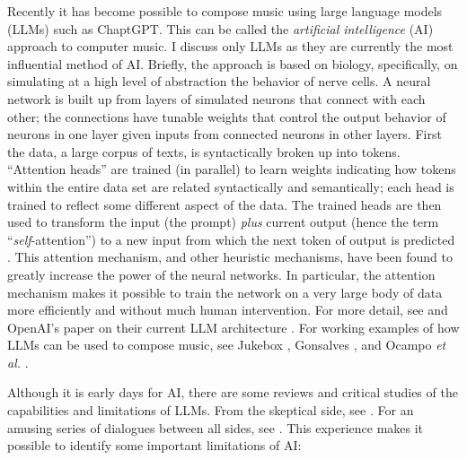 \documentclass[11pt,papersize=a4]{scrartcl}
\begin{document}
Recently it has become possible to compose music using large language models (LLMs) such as ChaptGPT. This can be called the \emph{artificial intelligence} (AI) approach to computer music. I discuss only LLMs as they are currently the most influential method of AI. Briefly, the approach is based on biology, specifically, on simulating at a high level of abstraction the behavior of nerve cells. A neural network is built up from layers of simulated neurons that connect with each other; the connections have tunable weights that control the output behavior of neurons in one layer given inputs from connected neurons in other layers. First the data, a large corpus of texts, is syntactically broken up into tokens. ``Attention heads'' are trained (in parallel) to learn weights indicating how tokens within the entire data set are related syntactically and semantically; each head is trained to reflect some different aspect of the data. The trained heads are then used to transform the input (the prompt) \emph{plus} current output (hence the term ``\emph{self}-attention'') to a new input from which the next token of output is predicted \parencite{vaswani2017attention}. This attention mechanism, and other heuristic mechanisms, have been found to greatly increase the power of the neural networks. In particular, the attention mechanism makes it possible to train the network on a very large body of data more efficiently and without much human intervention. For more detail, see \parencite{zhang2023complete} and OpenAI's paper on their current LLM architecture \parencite{openai2023gpt4}. For working examples of how LLMs can be used to compose music, see Jukebox \parencite{openai2023jukebox}, Gonsalves \parencite{aitunes}, and Ocampo \emph{et al.} \parencite{ocampo2023using}.

Although it is early days for AI, there are some reviews and critical studies of the capabilities and limitations of LLMs. From the skeptical side, see \parencite{dale2021gpt}. For an amusing series of dialogues between all sides, see \parencite{shtetl}. This experience makes it possible to identify some important limitations of AI:
\end{document}
